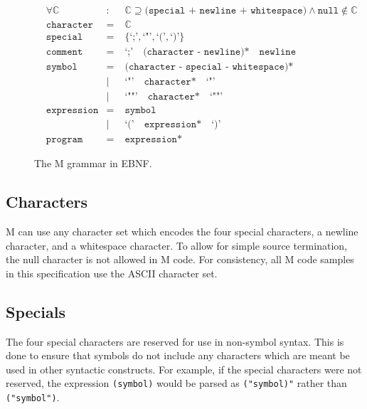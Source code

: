 \documentclass[11pt]{article}
\begin{document}
    \begin{figure*}[h]
        \centering
        \begin{align*}
            &\forall\mathbb{C}  &:&\;\mathbb{C}\supseteq\texttt{(special + newline + whitespace)}\land\texttt{null}\notin\mathbb{C}\\
            &\texttt{character} &=&\;\mathbb{C}\\
            &\texttt{special}   &=&\;\{\texttt{`;'},\texttt{`"'},\texttt{`('},\texttt{`)'}\}\\
            &\texttt{comment}   &=&\;\texttt{`;'}\quad\texttt{(character - newline)*}\quad\texttt{newline}\\
            &\texttt{symbol}    &=&\;\texttt{(character - special - whitespace)*}\\
            & &|&\;\texttt{`"'}\quad\texttt{character*}\quad\texttt{`"'}\\
            & &|&\;\texttt{`""'}\quad\texttt{character*}\quad\texttt{`""'}\\
            &\texttt{expression}&=&\;\texttt{symbol}\\
            & &|&\;\texttt{`('}\quad\texttt{expression*}\quad\texttt{`)'}\\
            &\texttt{program}   &=&\;\texttt{expression*}
        \end{align*}
        \caption{The M grammar in EBNF.}
    \end{figure*}

    \subsection{Characters}\label{subsec:characters}

    \begin{minipage}{\columnwidth}
        M can use any character set which encodes the four special characters, a newline character, and a whitespace character.
        To allow for simple source termination, the null character is not allowed in M code.
        For consistency, all M code samples in this specification use the ASCII character set.
    \end{minipage}

    \subsection{Specials}\label{subsec:specials}

    \begin{minipage}{\columnwidth}
        The four special characters are reserved for use in non-symbol syntax.
        This is done to ensure that symbols do not include any characters which are meant be used in other syntactic constructs.
        For example, if the special characters were not reserved, the expression \texttt{(symbol)} would be parsed as \texttt{("symbol)"} rather than \texttt{("symbol")}.
    \end{minipage}
\end{document}

